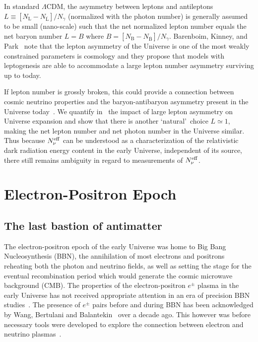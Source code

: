 \documentclass[universe,article,submit,moreauthors,pdftex,a4paper]{Definitions/mdpi}
\newcommand*{\xblue}{\color{blue}}
\begin{document}
In standard $\Lambda$CDM, the asymmetry between leptons and antileptons $L\equiv [N_\mathrm{L}-N_{\overline{\mathrm{L}}}] /N_\gamma $ (normalized with the photon number) is generally assumed to be small (nano-scale) such that the net normalized lepton number equals the net baryon number $L=B$ where $B=[N_\mathrm{B}-N_{\overline{\mathrm{B}}}]/N_\gamma $. Barenboim, Kinney, and Park~\cite{Barenboim:2016shh,Barenboim:2017dfq} note that the lepton asymmetry of the Universe is one of the most weakly constrained parameters is cosmology and they propose that models with leptogenesis are able to accommodate a large lepton number asymmetry surviving up to today. 

{\xblue If lepton number is grossly broken, this could provide a connection between cosmic neutrino properties and the baryon-antibaryon asymmetry present in the Universe today~\cite{Barenboim:2017dfq}.} We quantify in~\cite{Yang:2018oqg} the impact of large lepton asymmetry on Universe expansion and show that there is another \lq natural\rq\ choice $L\simeq 1$, making the net lepton number and net photon number in the Universe similar. Thus because $N_{\nu}^{{\rm eff}}$ can be understood as a characterization of the relativistic dark radiation energy content in the early Universe, independent of its source, there still remains ambiguity in regard to measurements of $N_{\nu}^{\rm eff}$.

\section{Electron-Positron Epoch}\label{sec:ElectronPositron}
\subsection{The last bastion of antimatter}\label{sec:ElectronPositronDensity}
\noindent The electron-positron epoch of the early Universe was home to Big Bang Nucleosynthesis (BBN), the annihilation of most electrons and positrons reheating both the photon and neutrino fields, as well as setting the stage for the eventual recombination period which would generate the cosmic microwave background (CMB). The properties of the electron-positron $e^{\pm}$ plasma in the early Universe has not received appropriate attention in an era of precision BBN studies~\cite{Pitrou:2018cgg}. The presence of $e^{\pm}$ pairs before and during BBN has been acknowledged by Wang, Bertulani and Balantekin~\cite{Wang:2010px,Hwang:2021kno} over a decade ago. This however was before necessary tools were developed to explore the connection between electron and neutrino plasmas~\cite{Mangano:2005cc,Birrell:2012gg,Birrell:2014uka}.
\end{document}
